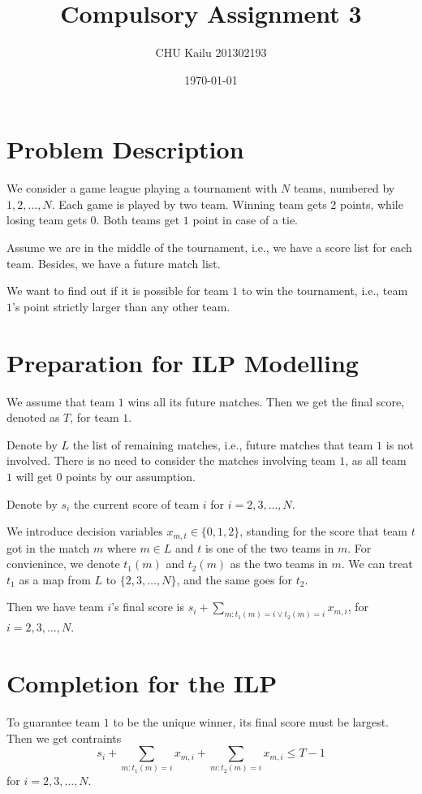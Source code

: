 \documentclass[10pt]{article}
\title{Compulsory Assignment 3}
\author{CHU Kailu 201302193}
\date{\today}
\begin{document}
\maketitle

\section{Problem Description}
We consider a game league playing a tournament with $N$ teams, 
numbered by $1,2,\dots,N$.
Each game is played by two team. 
Winning team gets $2$ points, while losing team gets $0$. 
Both teams get $1$ point in case of a tie.

Assume we are in the middle of the tournament, i.e., 
we have a score list for each team.
Besides, we have a future match list.

We want to find out if it is possible for team $1$ to win the tournament,
i.e., team $1$'s point strictly larger than any other team.

\section{Preparation for ILP Modelling}
We assume that team $1$ wins all its future matches. 
Then we get the final score, denoted as $T$, for team $1$.

Denote by $L$ the list of remaining matches, i.e., 
future matches that team $1$ is not involved.
There is no need to consider the matches involving team $1$,
as all team $1$ will get $0$ points by our assumption.

Denote by $s_i$ the current score of team $i$ for $i=2,3,\dots,N$.

We introduce decision variables $x_{m,t} \in \{0,1,2\}$, 
standing for the score that team $t$ got in the match $m$
where $m \in L$ and $t$ is one of the two teams in $m$.
For convienince, we denote $t_1(m)$ and $t_2(m)$ as the two teams in $m$.
We can treat $t_1$ as a map from $L$ to $\{2,3,\dots,N\}$, 
and the same goes for $t_2$.

Then we have team $i$'s final score is 
$s_i+ \sum_{m: t_1(m)=i \vee t_2(m)=i} x_{m,i}$, for $i = 2,3,\dots,N$.

\section{Completion for the ILP}
To guarantee team $1$ to be the unique winner, its final score must be largest.
Then we get contraints
\[
  s_i+ \sum_{m: t_1(m)=i}x_{m,i} + \sum_{m: t_2(m)=i}x_{m,i} \leq T-1
\]
for $i = 2,3,\dots,N$.
\end{document}
